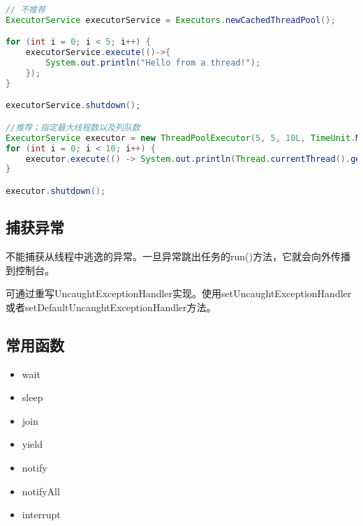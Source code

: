 
\begin{lstlisting}[language=java]
// 不推荐
ExecutorService executorService = Executors.newCachedThreadPool();

for (int i = 0; i < 5; i++) {
    executorService.execute(()->{
        System.out.println("Hello from a thread!");
    });
}

executorService.shutdown();

//推荐；指定最大线程数以及列队数
ExecutorService executor = new ThreadPoolExecutor(5, 5, 10L, TimeUnit.MILLISECONDS, new LinkedBlockingQueue<>(10));
for (int i = 0; i < 10; i++) {
    executor.execute(() -> System.out.println(Thread.currentThread().getName() + ":ThreadPoolExecutor"));
}

executor.shutdown();

\end{lstlisting}


\subsection{捕获异常}

不能捕获从线程中逃逸的异常。一旦异常跳出任务的run()方法，它就会向外传播到控制台。

可通过重写UncaughtExceptionHandler实现。使用setUncaughtExceptionHandler或者setDefaultUncaughtExceptionHandler方法。



\subsection{常用函数}

\begin{itemize}
    \item wait
    \item sleep
    \item join
    \item yield
    \item notify
    \item notifyAll
    \item interrupt
\end{itemize}


